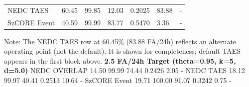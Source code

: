 \documentclass[
]{article}
\begin{document}
\begin{longtable}[]{@{}lllllll@{}}
\begin{minipage}[t]{0.12\columnwidth}\raggedright
NEDC TAES\strut
\end{minipage} & \begin{minipage}[t]{0.12\columnwidth}\raggedright
60.45\strut
\end{minipage} & \begin{minipage}[t]{0.12\columnwidth}\raggedright
99.85\strut
\end{minipage} & \begin{minipage}[t]{0.12\columnwidth}\raggedright
12.03\strut
\end{minipage} & \begin{minipage}[t]{0.12\columnwidth}\raggedright
0.2025\strut
\end{minipage} & \begin{minipage}[t]{0.12\columnwidth}\raggedright
83.88\strut
\end{minipage} & \begin{minipage}[t]{0.12\columnwidth}\raggedright
-\strut
\end{minipage}\tabularnewline
\begin{minipage}[t]{0.12\columnwidth}\raggedright
SzCORE Event\strut
\end{minipage} & \begin{minipage}[t]{0.12\columnwidth}\raggedright
40.59\strut
\end{minipage} & \begin{minipage}[t]{0.12\columnwidth}\raggedright
99.99\strut
\end{minipage} & \begin{minipage}[t]{0.12\columnwidth}\raggedright
83.77\strut
\end{minipage} & \begin{minipage}[t]{0.12\columnwidth}\raggedright
0.5470\strut
\end{minipage} & \begin{minipage}[t]{0.12\columnwidth}\raggedright
3.36\strut
\end{minipage} & \begin{minipage}[t]{0.12\columnwidth}\raggedright
-\strut
\end{minipage}\tabularnewline
\bottomrule
\end{longtable}

Note: The NEDC TAES row at 60.45\% (83.88 FA/24h) reflects an alternate
operating point (not the default). It is shown for completeness; default
TAES appears in the first block above. \textbar{} \textbf{2.5 FA/24h
Target (theta=0.95, k=5, d=5.0)} \textbar{} \textbar{} NEDC OVERLAP
\textbar{} 14.50 \textbar{} 99.99 \textbar{} 74.44 \textbar{} 0.2426
\textbar{} 2.05 \textbar{} - \textbar{} \textbar{} NEDC TAES \textbar{}
18.12 \textbar{} 99.97 \textbar{} 40.41 \textbar{} 0.2513 \textbar{}
10.64 \textbar{} - \textbar{} \textbar{} SzCORE Event \textbar{} 19.71
\textbar{} 100.00 \textbar{} 91.07 \textbar{} 0.3242 \textbar{} 0.75
\textbar{} - \textbar{}
\end{document}
